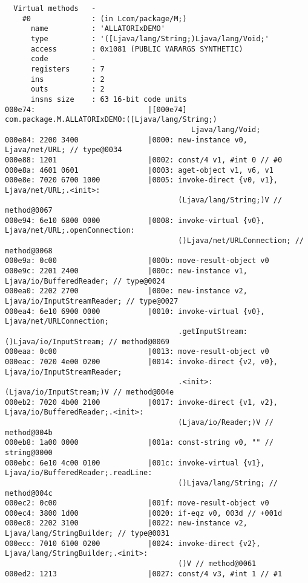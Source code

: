 \begin{lstlisting}
  Virtual methods   -
    #0              : (in Lcom/package/M;)
      name          : 'ALLATORIxDEMO'
      type          : '([Ljava/lang/String;)Ljava/lang/Void;'
      access        : 0x1081 (PUBLIC VARARGS SYNTHETIC)
      code          -
      registers     : 7
      ins           : 2
      outs          : 2
      insns size    : 63 16-bit code units
000e74:                          |[000e74] com.package.M.ALLATORIxDEMO:([Ljava/lang/String;)
                                           Ljava/lang/Void;
000e84: 2200 3400                |0000: new-instance v0, Ljava/net/URL; // type@0034
000e88: 1201                     |0002: const/4 v1, #int 0 // #0
000e8a: 4601 0601                |0003: aget-object v1, v6, v1
000e8e: 7020 6700 1000           |0005: invoke-direct {v0, v1}, Ljava/net/URL;.<init>:
                                        (Ljava/lang/String;)V // method@0067
000e94: 6e10 6800 0000           |0008: invoke-virtual {v0}, Ljava/net/URL;.openConnection:
                                        ()Ljava/net/URLConnection; // method@0068
000e9a: 0c00                     |000b: move-result-object v0
000e9c: 2201 2400                |000c: new-instance v1, Ljava/io/BufferedReader; // type@0024
000ea0: 2202 2700                |000e: new-instance v2, Ljava/io/InputStreamReader; // type@0027
000ea4: 6e10 6900 0000           |0010: invoke-virtual {v0}, Ljava/net/URLConnection;
                                        .getInputStream:()Ljava/io/InputStream; // method@0069
000eaa: 0c00                     |0013: move-result-object v0
000eac: 7020 4e00 0200           |0014: invoke-direct {v2, v0}, Ljava/io/InputStreamReader;
                                        .<init>:(Ljava/io/InputStream;)V // method@004e
000eb2: 7020 4b00 2100           |0017: invoke-direct {v1, v2}, Ljava/io/BufferedReader;.<init>:
                                        (Ljava/io/Reader;)V // method@004b
000eb8: 1a00 0000                |001a: const-string v0, "" // string@0000
000ebc: 6e10 4c00 0100           |001c: invoke-virtual {v1}, Ljava/io/BufferedReader;.readLine:
                                        ()Ljava/lang/String; // method@004c
000ec2: 0c00                     |001f: move-result-object v0
000ec4: 3800 1d00                |0020: if-eqz v0, 003d // +001d
000ec8: 2202 3100                |0022: new-instance v2, Ljava/lang/StringBuilder; // type@0031
000ecc: 7010 6100 0200           |0024: invoke-direct {v2}, Ljava/lang/StringBuilder;.<init>:
                                        ()V // method@0061
000ed2: 1213                     |0027: const/4 v3, #int 1 // #1

\end{lstlisting}

